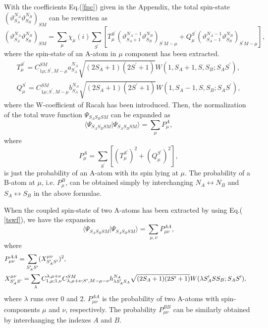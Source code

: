 \documentclass[10pt]{wlscirep}
\begin{document}
With the coefficients Eq.(\ref{fpc}) given in the Appendix, the total
spin-state $(\vartheta_{S_A}^{N_A}\vartheta_{S_B}^{N_B})_{SM}$ can be
rewritten as
\begin{equation}
(\vartheta_{S_A}^{N_A} \vartheta_{S_B}^{N_B})_{SM} = \sum_{\mu}
\chi_{\mu}(i) \sum_{S^{\prime }} [ T_{\mu}^{S^{\prime }}
(\vartheta_{S_A+1}^{N_A-1} \vartheta_{S_B}^{N_B})_{S^{\prime }M-\mu }
+Q_{\mu}^{S^{\prime }} (\vartheta_{S_A-1}^{N_A-1}
\vartheta_{S_B}^{N_B})_{S^{\prime }M-\mu }],  \label{tss}
\end{equation}
where the spin-state of an A-atom in $\mu$ component has been extracted.
\begin{eqnarray}
& T_{\mu}^{S^{\prime }} = C_{1\mu;S^{\prime },M-\mu}^{SM} a_{S_A}^{N_A}
\sqrt{(2S_A+1)(2S^{\prime }+1)} W(1,S_A+1,S,S_B;S_AS^{\prime }),&  \label{p}
\\
& Q_{\mu}^{S^{\prime }} = C_{1\mu;S^{\prime },M-\mu}^{SM} b_{S_A}^{N_A}
\sqrt{(2S_A+1)(2S^{\prime }+1)} W(1,S_A-1,S,S_B;S_AS^{\prime }),&  \label{q}
\end{eqnarray}
where the W-coefficient of Racah has been introduced. Then, the
normalization of the total wave function $\Psi_{S_AS_BSM}$ can be expanded
as
\begin{equation}
\langle\Psi_{S_AS_BSM}|\Psi_{S_AS_BSM}\rangle = \sum_{\mu}P_{\mu}^A,
\end{equation}
where
\begin{equation}
P_{\mu }^A = \sum_{S^{\prime }} [(T_{\mu}^{S^{\prime
}})^2+(Q_{\mu}^{S^{\prime }})^2],
\end{equation}
is just the probability of an A-atom with its spin lying at $\mu$. The
probability of a B-atom at $\mu$, i.e. $P_{\mu}^B$, can be obtained simply
by interchanging $N_A\leftrightarrow N_B$ and $S_A\leftrightarrow S_B$ in
the above formulae.

When the coupled spin-state of two A-atoms has been extracted by using Eq.(%
\ref{tswf}), we have the expansion
\begin{equation}
\langle\Psi_{S_AS_BSM}|\Psi_{S_AS_BSM}\rangle =
\sum_{\mu,\nu}P_{\mu\nu}^{AA},
\end{equation}
where
\begin{eqnarray}
& P_{\mu\nu}^{AA} = \sum_{S^{\prime }_AS^{\prime }} (X_{S^{\prime
}_AS^{\prime }}^{\mu\nu})^2,& \\
& X_{S_A^{\prime }S^{\prime }}^{\mu\nu} = \sum_{\lambda}
C_{1,\mu;1,\nu}^{\lambda,\mu+\nu} C_{\lambda,\mu+\nu;S^{\prime
},M-\mu-\nu}^{SM} h_{\lambda S_A^{\prime }S_A}^{N_A} \sqrt{%
(2S_A+1)(2S^{\prime }+1)} W(\lambda S_A^{\prime }SS_B;S_AS^{\prime }),&
\end{eqnarray}
where $\lambda$ runs over $0$ and $2$. $P_{\mu\nu}^{AA}$ is the probability
of two A-atoms with spin-components $\mu$ and $\nu$, respectively. The
probability $P_{\mu\nu}^{BB}$ can be similarly obtained by interchanging the
indexes $A$ and $B$.
\end{document}
